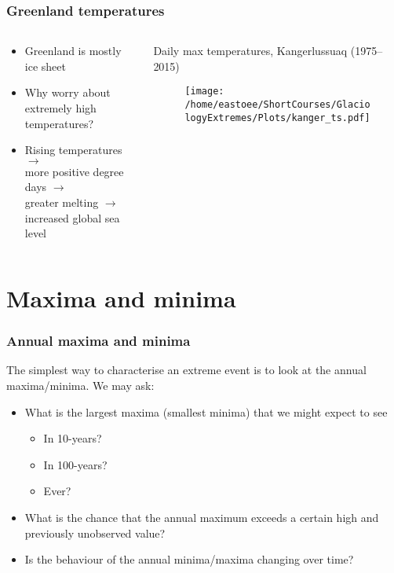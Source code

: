 \documentclass[dvipsnames]{beamer}
\begin{document}
\begin{frame}
\frametitle{Greenland temperatures}

\begin{columns}[T]
\begin{column}{0.5\textwidth}
\vfill
\begin{itemize}
\item
Greenland is mostly ice sheet
\item
Why worry about extremely high temperatures?
\item
Rising temperatures $\rightarrow$ \\
more positive degree days $\rightarrow$ \\greater melting $\rightarrow$ \\increased global sea level
\end{itemize}
\vfill
\end{column}
\hfill
\begin{column}{0.5\textwidth}
Daily max temperatures, Kangerlussuaq (1975--2015)
\begin{figure}
\centering
{\texttt{[image: /home/eastoee/ShortCourses/GlaciologyExtremes/Plots/kanger\_ts.pdf]}}
\end{figure}
\end{column}
\end{columns}
\end{frame}

\section{Maxima and minima}

\begin{frame}
\frametitle{Annual maxima and minima}

The simplest way to characterise an extreme event is to look at the annual maxima/minima. We may ask:


\begin{itemize}
\item
What is the largest maxima (smallest minima) that we might expect to see
\begin{itemize}
\item
In 10-years?
\item
In 100-years?
\item
Ever?
\end{itemize}
\item
What is the chance that the annual maximum exceeds a certain high and previously unobserved value?
\item
Is the behaviour of the annual minima/maxima changing over time?
\end{itemize}
\end{frame}
\end{document}
